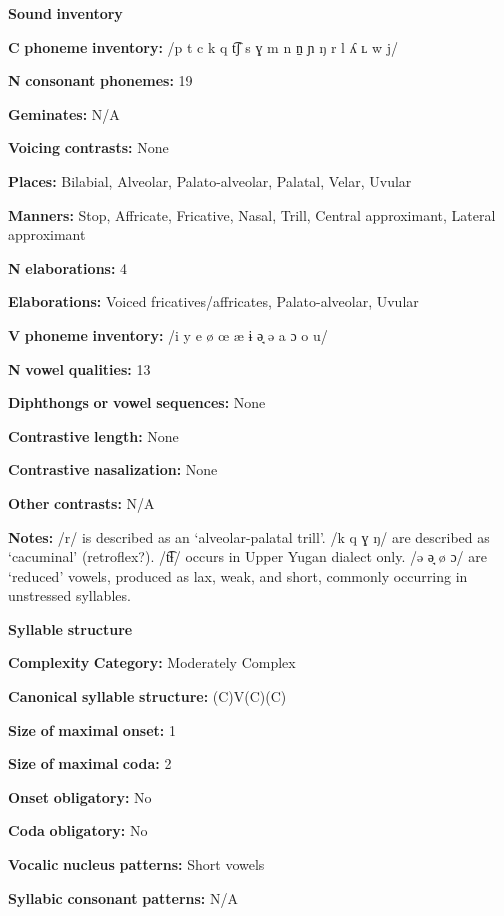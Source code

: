 \begin{styleBody}
\textbf{Sound} \textbf{inventory}

\textbf{C} \textbf{phoneme} \textbf{inventory:} /p t c k q t͡ʃ s ɣ m n n̠ ɲ ŋ r l ʎ ʟ w j/

\textbf{N} \textbf{consonant} \textbf{phonemes:} 19

\textbf{Geminates:} N/A

\textbf{Voicing} \textbf{contrasts:} None

\textbf{Places:} Bilabial, Alveolar, Palato-alveolar, Palatal, Velar, Uvular

\textbf{Manners:} Stop, Affricate, Fricative, Nasal, Trill, Central approximant, Lateral approximant

\textbf{N} \textbf{elaborations:} 4

\textbf{Elaborations:} Voiced fricatives/affricates, Palato-alveolar, Uvular

\textbf{V} \textbf{phoneme} \textbf{inventory:} /i y e ø œ æ ɨ ə̘ ə a ɔ o u/

\textbf{N} \textbf{vowel} \textbf{qualities:} 13

\textbf{Diphthongs} \textbf{or} \textbf{vowel} \textbf{sequences:} None

\textbf{Contrastive} \textbf{length:} None

\textbf{Contrastive} \textbf{nasalization:} None

\textbf{Other} \textbf{contrasts:} N/A

\textbf{Notes:} /r/ is described as an ‘alveolar-palatal trill’. /k q ɣ ŋ/ are described as ‘cacuminal’ (retroflex?). /t͡ɬ/ occurs in Upper Yugan dialect only. /ə ə̘ ø ɔ/ are ‘reduced’ vowels, produced as lax, weak, and short, commonly occurring in unstressed syllables.

\textbf{Syllable} \textbf{structure}

\textbf{Complexity} \textbf{Category:} Moderately Complex

\textbf{Canonical} \textbf{syllable} \textbf{structure:} (C)V(C)(C) \citep[53-7]{Filchenko2007}

\textbf{Size} \textbf{of} \textbf{maximal} \textbf{onset:} 1

\textbf{Size} \textbf{of} \textbf{maximal} \textbf{coda:} 2

\textbf{Onset} \textbf{obligatory:} No

\textbf{Coda} \textbf{obligatory:} No

\textbf{Vocalic} \textbf{nucleus} \textbf{patterns:} Short vowels

\textbf{Syllabic} \textbf{consonant} \textbf{patterns:} N/A


\end{styleBody}
